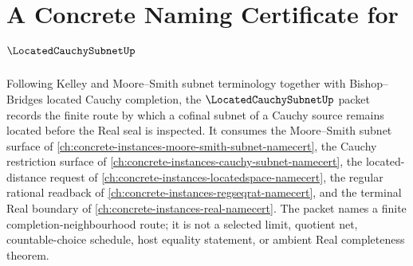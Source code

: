 \chapter{A Concrete Naming Certificate for $\LocatedCauchySubnetUp$}
\label{ch:concrete-instances-located-cauchy-subnet-namecert}

Following Kelley and Moore--Smith subnet terminology together with Bishop--Bridges located Cauchy completion, the $\LocatedCauchySubnetUp$ packet records the finite route by which a cofinal subnet of a Cauchy source remains located before the Real seal is inspected. It consumes the Moore--Smith subnet surface of \autoref{ch:concrete-instances-moore-smith-subnet-namecert}, the Cauchy restriction surface of \autoref{ch:concrete-instances-cauchy-subnet-namecert}, the located-distance request of \autoref{ch:concrete-instances-locatedspace-namecert}, the regular rational readback of \autoref{ch:concrete-instances-regseqrat-namecert}, and the terminal Real boundary of \autoref{ch:concrete-instances-real-namecert}. The packet names a finite completion-neighbourhood route; it is not a selected limit, quotient net, countable-choice schedule, host equality statement, or ambient Real completeness theorem.


